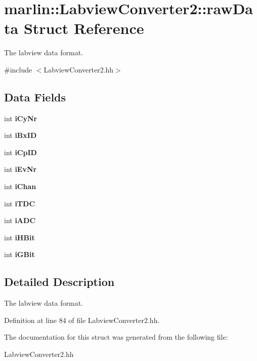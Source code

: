 \section{marlin::LabviewConverter2::rawData Struct Reference}
\label{structmarlin_1_1LabviewConverter2_1_1rawData}


The labview data format.  


{\ttfamily \#include $<$LabviewConverter2.hh$>$}\subsection*{Data Fields}
\begin{DoxyCompactItemize}
\item 
int {\bfseries iCyNr}\label{structmarlin_1_1LabviewConverter2_1_1rawData_a03006803e0b5b2da5820d8bc95b25821}

\item 
int {\bfseries iBxID}\label{structmarlin_1_1LabviewConverter2_1_1rawData_a18813688dc645068904762d7179caabf}

\item 
int {\bfseries iCpID}\label{structmarlin_1_1LabviewConverter2_1_1rawData_a4b6d90d46ac4234bb39db626efe25b90}

\item 
int {\bfseries iEvNr}\label{structmarlin_1_1LabviewConverter2_1_1rawData_a4e4d521b9951a3a093add42abe718d24}

\item 
int {\bfseries iChan}\label{structmarlin_1_1LabviewConverter2_1_1rawData_a2c95f1ea0b28bde1aa11fa0c17831e33}

\item 
int {\bfseries iTDC}\label{structmarlin_1_1LabviewConverter2_1_1rawData_a70f867c80e05e01037317f08d09341fb}

\item 
int {\bfseries iADC}\label{structmarlin_1_1LabviewConverter2_1_1rawData_a0a42ca5b0eb49a252c6b6fbc565978a4}

\item 
int {\bfseries iHBit}\label{structmarlin_1_1LabviewConverter2_1_1rawData_a82258aad93b77ba908e7b751d59088a1}

\item 
int {\bfseries iGBit}\label{structmarlin_1_1LabviewConverter2_1_1rawData_ae932bf4a10f7064fbd36b823eca20f6e}

\end{DoxyCompactItemize}


\subsection{Detailed Description}
The labview data format. 

Definition at line 84 of file LabviewConverter2.hh.

The documentation for this struct was generated from the following file:\begin{DoxyCompactItemize}
\item 
LabviewConverter2.hh\end{DoxyCompactItemize}
